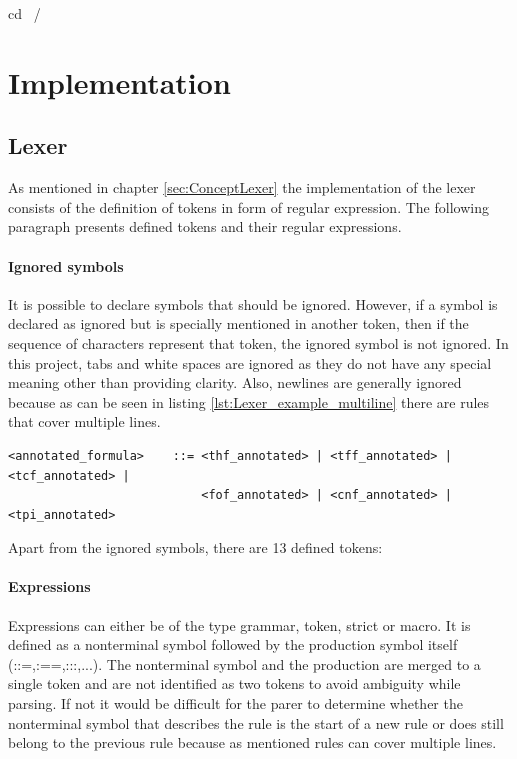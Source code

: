 cd ~/%


\chapter{Implementation}\label{cha:Implementation}

\section{Lexer}\label{sec:ImplementationLexer}

As mentioned in chapter \ref{sec:ConceptLexer} the implementation of the lexer consists of the definition of tokens in form of regular expression. The following paragraph presents defined tokens and their regular expressions.

\subsubsection{Ignored symbols}
It is possible to declare symbols that should be ignored. However, if a symbol is declared as ignored but is specially mentioned in another token, then if the sequence
of characters represent that token, the ignored symbol is not ignored. In this project, tabs and white spaces are ignored as they do not have any special meaning other than providing clarity.
Also, newlines are generally ignored because as can be seen in listing \ref{lst:Lexer_example_multiline} there are rules that cover multiple lines.

\begin{lstlisting}[basicstyle=\scriptsize	,caption= Multi line production rule,label= lst:Lexer_example_multiline]
<annotated_formula>    ::= <thf_annotated> | <tff_annotated> | <tcf_annotated> |
                           <fof_annotated> | <cnf_annotated> | <tpi_annotated>
\end{lstlisting}

Apart from the ignored symbols, there are 13 defined tokens:

\subsubsection{Expressions}

Expressions can either be of the type grammar, token, strict or macro. It is defined as a nonterminal symbol followed by the production symbol itself (::=,:==,:::,...). The nonterminal symbol and the production are merged to a single token and are not identified as two tokens to avoid ambiguity while parsing. If not it would be difficult for the parer to determine whether the nonterminal symbol that describes the rule is the start of a new rule or does still belong to the previous rule because as mentioned rules can cover multiple lines.

